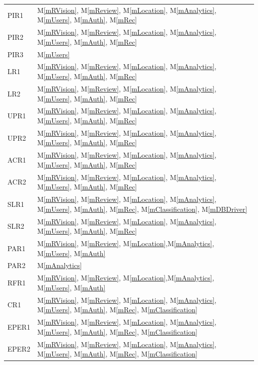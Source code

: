 \documentclass[12pt, titlepage]{article}
\newcommand{\mref}[1]{M\ref{#1}}
\begin{document}
\begin{longtable}{p{} p{}}
PIR1 & \mref{mRVision}, \mref{mReview}, \mref{mLocation}, \mref{mAnalytics}, \mref{mUsers}, \mref{mAuth}, \mref{mRec}\\
PIR2 & \mref{mRVision}, \mref{mReview}, \mref{mLocation}, \mref{mAnalytics}, \mref{mUsers}, \mref{mAuth}, \mref{mRec}\\
PIR3 & \mref{mUsers}\\
LR1 & \mref{mRVision}, \mref{mReview}, \mref{mLocation}, \mref{mAnalytics}, \mref{mUsers}, \mref{mAuth}, \mref{mRec}\\
LR2 & \mref{mRVision}, \mref{mReview}, \mref{mLocation}, \mref{mAnalytics}, \mref{mUsers}, \mref{mAuth}, \mref{mRec}\\
UPR1 & \mref{mRVision}, \mref{mReview}, \mref{mLocation}, \mref{mAnalytics}, \mref{mUsers}, \mref{mAuth}, \mref{mRec}\\
UPR2 & \mref{mRVision}, \mref{mReview}, \mref{mLocation}, \mref{mAnalytics}, \mref{mUsers}, \mref{mAuth}, \mref{mRec}\\
ACR1 & \mref{mRVision}, \mref{mReview}, \mref{mLocation}, \mref{mAnalytics}, \mref{mUsers}, \mref{mAuth}, \mref{mRec}\\
ACR2 & \mref{mRVision}, \mref{mReview}, \mref{mLocation}, \mref{mAnalytics}, \mref{mUsers}, \mref{mAuth}, \mref{mRec}\\
SLR1 & \mref{mRVision}, \mref{mReview}, \mref{mLocation}, \mref{mAnalytics}, \mref{mUsers}, \mref{mAuth}, \mref{mRec}, \mref{mClassification}, \mref{mDBDriver}\\
SLR2 & \mref{mRVision}, \mref{mReview}, \mref{mLocation}, \mref{mAnalytics}, \mref{mUsers}, \mref{mAuth}, \mref{mRec}\\
PAR1 & \mref{mRVision}, \mref{mReview}, \mref{mLocation},\mref{mAnalytics}, \mref{mUsers}, \mref{mAuth}\\
PAR2 & \mref{mAnalytics}\\
RFR1 & \mref{mRVision}, \mref{mReview}, \mref{mLocation},\mref{mAnalytics}, \mref{mUsers}, \mref{mAuth}\\
CR1 & \mref{mRVision}, \mref{mReview}, \mref{mLocation}, \mref{mAnalytics}, \mref{mUsers}, \mref{mAuth}, \mref{mRec}, \mref{mClassification}\\
EPER1 & \mref{mRVision}, \mref{mReview}, \mref{mLocation}, \mref{mAnalytics}, \mref{mUsers}, \mref{mAuth}, \mref{mRec}, \mref{mClassification}\\
EPER2 & \mref{mRVision}, \mref{mReview}, \mref{mLocation}, \mref{mAnalytics}, \mref{mUsers}, \mref{mAuth}, \mref{mRec}, \mref{mClassification}\\

\end{longtable}
\end{document}
